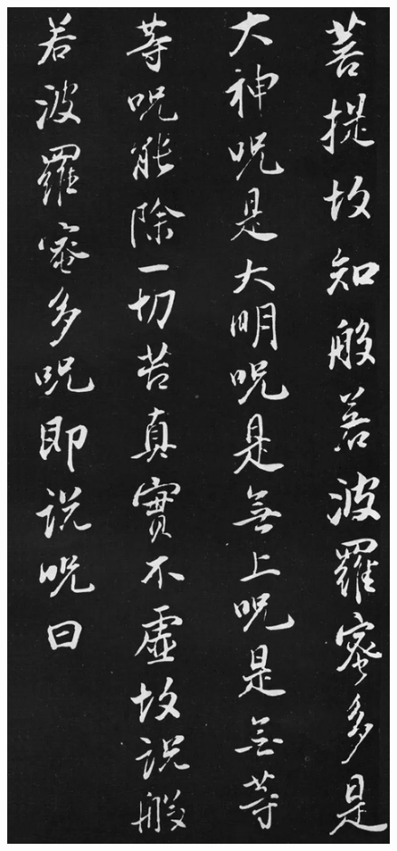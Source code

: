 \documentclass[a4paper,twoside]{article}
\begin{document}
\begin{figure}[ht]
\centering
\includegraphics[width=11.2cm]{images/dongqichang-6}
\end{figure}
\end{document}

